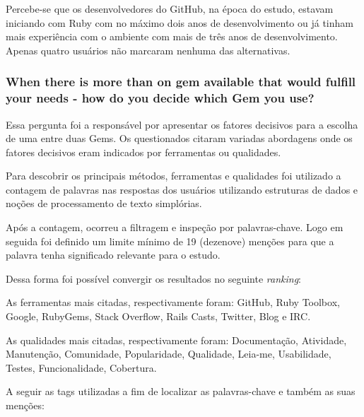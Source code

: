   Percebe-se que os desenvolvedores do GitHub, na época do estudo, estavam iniciando com Ruby com no máximo dois anos de desenvolvimento ou já tinham mais experiência com o ambiente com mais de três anos de desenvolvimento. Apenas quatro usuários não marcaram nenhuma das alternativas.

  \subsubsection{When there is more than on gem available that would fulfill your needs - how do you decide which Gem you use?}
  
  Essa pergunta foi a responsável por apresentar os fatores decisivos para a escolha de uma entre duas Gems. Os questionados citaram variadas abordagens onde os fatores decisivos eram indicados por ferramentas ou qualidades.
  
  Para descobrir os principais métodos, ferramentas e qualidades foi utilizado a contagem de palavras nas respostas dos usuários utilizando estruturas de dados e noções de processamento de texto simplórias.
  
  Após a contagem, ocorreu a filtragem e inspeção por palavras-chave. Logo em seguida foi definido um limite mínimo de 19 (dezenove) menções para que a palavra tenha significado relevante para o estudo.
  
  Dessa forma foi possível convergir os resultados no seguinte \textit{ranking}:
  
  As ferramentas mais citadas, respectivamente foram: GitHub, Ruby Toolbox, Google, RubyGems, Stack Overflow, Rails Casts, Twitter, Blog e IRC.
  
  As qualidades mais citadas, respectivamente foram: Documentação, Atividade, Manutenção, Comunidade, Popularidade, Qualidade, Leia-me, Usabilidade, Testes, Funcionalidade, Cobertura.
  
\newpage

  A seguir as tags utilizadas a fim de localizar as palavras-chave e também as suas menções:

